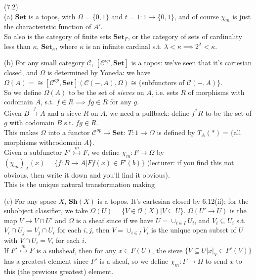 \documentclass[a4paper]{article}
\begin{document}
\begin{eg} (7.2)\\
    (a) $\mathbf{Set}$ is a topos, with $\Omega =\{0,1\}$ and $t=1:1 \to \{0,1\}$, and of course $\chi_m$ is just the characteristic function of $A'$.\\
    So also is the category of finite sets $\mathbf{Set}_F$, or the category of sets of cardinality less than $\kappa$, $\mathbf{Set}_\kappa$, where $\kappa$ is an infinite cardinal s.t. $\lambda < \kappa \implies 2^\lambda < \kappa$.

    (b) For any small category $\mathcal{C}$, $[\mathcal{C}^{op},\mathbf{Set}]$ is a topos: we've seen that it's cartesian closed, and $\Omega$ is determined by Yoneda: we have\\
    $\Omega(A) = \cong [\mathcal{C}^{op},\mathbf{Set}](\mathcal{C}(-,A),\Omega) \cong \{$subfunctors of $\mathcal{C}(-,A)\}$.\\
    So we define $\Omega(A)$ to be the set of \emph{sieves} on $A$, i.e. sets $R$ of morphisms with codomain $A$, s.t. $f \in R \implies fg \in R$ for any $g$.\\
    Given $B\xrightarrow{f} A$ and a sieve $R$ on $A$, we need a pullback: define $f^* R$ to be the set of $g$ with codomain $B$ s.t. $fg \in R$.\\
    This makes $\Omega$ into a functor $\mathcal{C}^{op} \to \mathbf{Set}$: $T:1 \to \Omega$ is defined by $T_A(*) = \{$all morphisms withcodomain $A\}$.\\
    Given a subfunctor $F' \stackrel{m}{\rightarrowtail} F$, we define $\chi_m:F \to \Omega$ by $(\chi_m)_A(x) = \{f:B \to A|Ff(x) \in F'(b)\}$ (lecturer: if you find this not obvious, then write it down and you'll find it obvious).\\
    This is the unique natural transformation making 


    (c) For any space $X$, $\mathbf{Sh}(X)$ is a topos. It's cartesian closed by 6.12(ii); for the subobject classifier, we take $\Omega(U) = \{V \in \mathcal{O}(X) | V \subseteq U\}$. $\Omega(U' \to U)$ is the map $V \to V\cap U'$ and $\Omega$ is a sheaf since if we have $U=\cup_{i \in I} U_i$, and $V_i \subseteq U_i$ s.t. $V_i \cap U_j = V_j \cap U_i$ for each $i,j$, then $V = \cup_{i \in I} V_i$ is the unique open subset of $U$ with $V \cap U_i = V_i$ for each $i$.\\
    If $F' \stackrel{m}{\rightarrowtail} F$ is a subsheaf, then for any $x \in F(U)$, the sieve $\{V \subseteq U | x|_V \in F'(V)\}$ has a greatest element since $F'$ is a sheaf, so we define $\chi_m:F \to \Omega$ to send $x$ to this (the previous greatest) element.


\end{eg}
\end{document}
